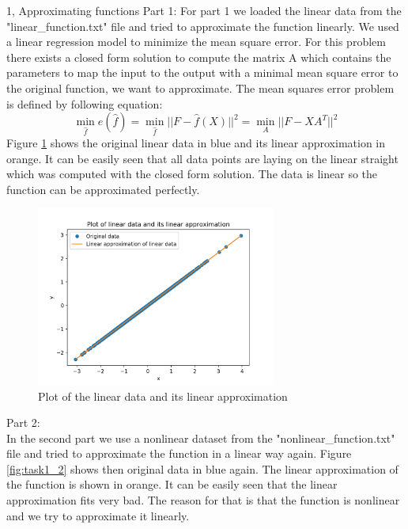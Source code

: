 \documentclass[10pt,a4paper]{article}
\begin{document}
\frontpage

\begin{task}{1, Approximating functions}
Part 1: \bigbreak
For part 1 we loaded the linear data from the "linear\_function.txt" file and tried to approximate the function linearly. We used a linear regression model to minimize the mean square error. For this problem there exists a closed form solution to compute the matrix A which contains the parameters to map the input to the output with a minimal mean square error to the original function, we want to approximate. 
The mean squares error problem is defined by following equation:
\begin{equation*}
\min_{\hat{f}}e(\hat{f}) = \min_{\hat{f}}||F-\hat{f}(X)||^2 = \min_{A}||F-XA^T||^2
\end{equation*}
Figure \ref{fig:task1_1} shows the original linear data in blue and its linear approximation in orange. It can be easily seen that all data points are laying on the linear straight which was computed with the closed form solution. The data is linear so the function can be approximated perfectly.
\begin{figure}[H]
\centering
\includegraphics[width=0.7\textwidth]{../plots/task1_part1.png}
\caption{Plot of the linear data and its linear approximation}
\label{fig:task1_1}
\end{figure}
Part 2: \\
In the second part we use a nonlinear dataset from the "nonlinear\_function.txt" file and tried to approximate the function in a linear way again.
Figure \ref{fig:task1_2} shows then original data in blue again. The linear approximation of the function is  shown in orange. It can be easily seen that the linear approximation fits very bad. The reason for that is that the function is nonlinear and we try to approximate it linearly.
\begin{figure}[H]

\end{figure}
\end{task}
\end{document}
